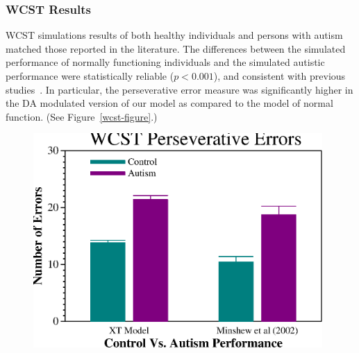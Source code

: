 \subsubsection{WCST Results} 
WCST simulations results of both healthy individuals and persons with autism 
matched those reported in the literature.  The differences between the 
simulated performance of normally functioning individuals and the
simulated autistic performance were statistically reliable
($p < 0.001$), and consistent with previous
studies~\cite{PriorMR:1990:AutismWCST,Ozonoff:1999:AutismStroopWCST,MinshewNJ:2002:AutismWCST}.
In particular, the perseverative error measure was significantly
higher in the DA modulated version of our model as compared to the
model of normal function.  (See Figure~\ref{wcst-figure}.)


\begin{figure}
\begin{center}
	\includegraphics[width=110mm]{graphs/wcst.ps}
                                                                
\textcolor{white}{\\--------------------------------\\}


\end{center}
\end{figure}
